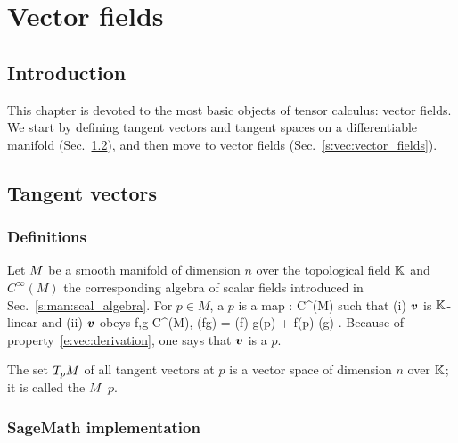 \chapter{Vector fields} \label{s:vec}

\minitoc

\section{Introduction}

This chapter is devoted to the most basic objects of tensor calculus:
vector fields. We start by defining tangent vectors and tangent spaces
on a differentiable manifold (Sec.~\ref{s:vec:tangent_vectors}), and then
move to vector fields (Sec.~\ref{s:vec:vector_fields}).

\section{Tangent vectors} \label{s:vec:tangent_vectors}

\subsection{Definitions} \label{s:vec:def_tangent_vector}

Let $M$ be a smooth manifold of dimension $n$ over the topological field $\mathbb{K}$
and $C^\infty(M)$ the corresponding algebra of scalar fields introduced in Sec.~\ref{s:man:scal_algebra}.
For $p\in M$, a  $p$ is
a map
\be
    : C^\infty(M) \longrightarrow \K
\ee
such that (i) $\bm{v}$ is $\mathbb{K}$-linear and (ii) $\bm{v}$ obeys
\be \label{e:vec:derivation}
    \forall f,g \in C^\infty(M),\quad
        (fg) = (f) g(p) + f(p) (g) .
\ee
Because of property~\eqref{e:vec:derivation}, one says that $\bm{v}$ is
a  $p$.

The set $T_pM$ of all tangent vectors at $p$ is a vector space of dimension
$n$ over $\mathbb{K}$; it is called the  $M$
 $p$.

\subsection{SageMath implementation} \label{s:vec:tangent_impl}

